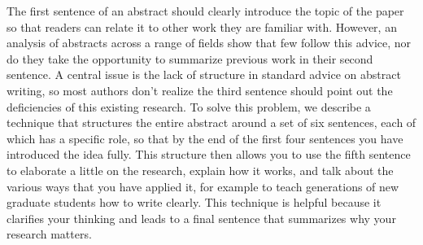 The first sentence of an abstract should clearly introduce the topic of the paper so that readers can relate it to other work they are familiar with.
However, an analysis of abstracts across a range of fields show that few follow this advice, nor do they take the opportunity to summarize previous work in their second sentence.
A central issue is the lack of structure in standard advice on abstract writing, so most authors don’t realize the third sentence should point out the deficiencies of this existing research.
To solve this problem, we describe a technique that structures the entire abstract around a set of six sentences, each of which has a specific role, so that by the end of the first four sentences you have introduced the idea fully.
This structure then allows you to use the fifth sentence to elaborate a little on the research, explain how it works, and talk about the various ways that you have applied it, for example to teach generations of new graduate students how to write clearly.
This technique is helpful because it clarifies your thinking and leads to a final sentence that summarizes why your research matters.
